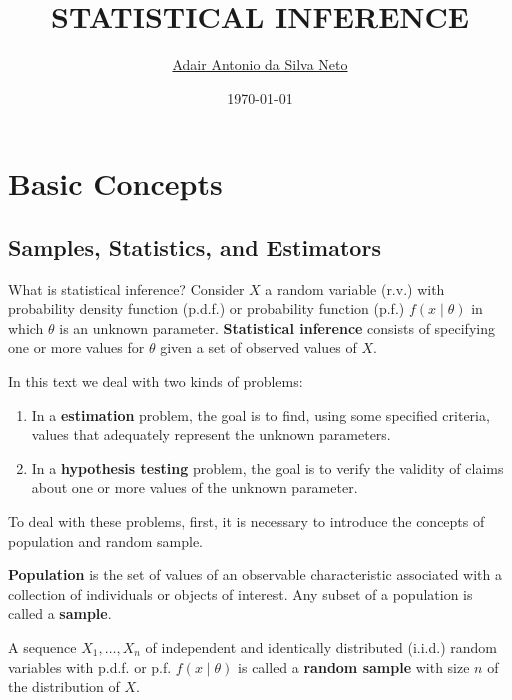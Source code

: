 \documentclass[12pt,a4paper]{report}
\author{\sffamily \href{https://github.com/adairneto}{Adair Antonio da Silva Neto}}
\title{\sffamily \uppercase{Statistical Inference}}
\date{\sffamily \today}
\begin{document}
\maketitle
\tableofcontents
\thispagestyle{empty}
\setcounter{page}{1}


\chapter{Basic Concepts}

\section{Samples, Statistics, and Estimators}

What is statistical inference? Consider $X$ a random variable (r.v.) with probability density function (p.d.f.) or probability function (p.f.) $f(x \mid \theta)$ in which $\theta$ is an unknown parameter. \textbf{Statistical inference} consists of specifying one or more values for $\theta$ given a set of observed values of $X$.

In this text we deal with two kinds of problems:
\begin{enumerate}
    \item In a \textbf{estimation} problem, the goal is to find, using some specified criteria, values that adequately represent the unknown parameters.
    \item In a \textbf{hypothesis testing} problem, the goal is to verify the validity of claims about one or more values of the unknown parameter. 
\end{enumerate}

To deal with these problems, first, it is necessary to introduce the concepts of population and random sample.

\begin{definition}
    \textbf{Population} is the set of values of an observable characteristic associated with a collection of individuals or objects of interest. Any subset of a population is called a \textbf{sample}.
\end{definition}

\begin{definition}
    A sequence $X_1, \ldots, X_n$ of independent and identically distributed (i.i.d.) random variables with p.d.f. or p.f. $f(x \mid \theta)$ is called a \textbf{random sample} with size $n$ of the distribution of $X$. 
\end{definition}
\end{document}

